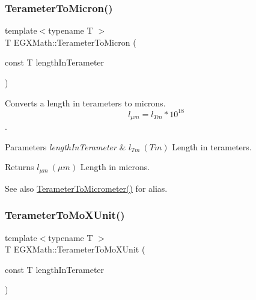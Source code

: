 \subsubsection{\texorpdfstring{Terameter\+To\+Micron()}{TerameterToMicron()}}
{\footnotesize\ttfamily template$<$typename T $>$ \\
T E\+G\+X\+Math\+::\+Terameter\+To\+Micron (\begin{DoxyParamCaption}\item[{const T}]{length\+In\+Terameter }\end{DoxyParamCaption})}



Converts a length in terameters to microns. \[ l_{\mu m}=l_{Tm} * 10^{18} \]. 


\begin{DoxyParams}{Parameters}
{\em length\+In\+Terameter} & $ l_{Tm}\ (Tm)$ Length in terameters. \\
\hline
\end{DoxyParams}
\begin{DoxyReturn}{Returns}
$ l_{\mu m}\ (\mu m)$ Length in microns. 
\end{DoxyReturn}
\begin{DoxySeeAlso}{See also}
\mbox{\hyperlink{group___e_g_x_math-_conversions-_length_conversions-_s_i-_terameter-_s_i_ga4f6fb943e4c16178f4060c01a9c00a02}{Terameter\+To\+Micrometer()}} for alias. 
\end{DoxySeeAlso}
\mbox{\label{group___e_g_x_math-_conversions-_length_conversions-_s_i-_terameter-_non-_s_i_ga391bcf9b529c2e20f2773c699bb0197a}} 
\subsubsection{\texorpdfstring{Terameter\+To\+Mo\+X\+Unit()}{TerameterToMoXUnit()}}
{\footnotesize\ttfamily template$<$typename T $>$ \\
T E\+G\+X\+Math\+::\+Terameter\+To\+Mo\+X\+Unit (\begin{DoxyParamCaption}\item[{const T}]{length\+In\+Terameter }\end{DoxyParamCaption})}



